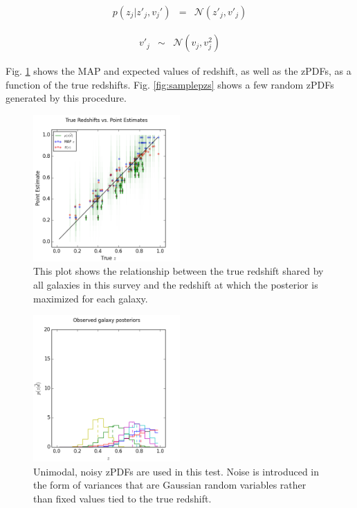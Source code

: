 \documentclass[preprint]{aastex}
\begin{document}
\begin{eqnarray}
\label{eq:zspread-noisy}
p(z_{j}|z'_{j},v_{j}') &=& \mathcal{N}(z'_{j},v'_{j})
\end{eqnarray}

\begin{eqnarray}
\label{eq:znoise}
v'_{j} &\sim& \mathcal{N}(v_{j},v^{2}_{j})
\end{eqnarray}

Fig. \ref{fig:noisycat} shows the MAP and expected values of redshift, as well 
as the zPDFs, as a function of the true redshifts.  Fig. \ref{fig:samplepzs} 
shows a few random zPDFs generated by this procedure.

\begin{figure}
\includegraphics[width=0.5\textwidth]{sigma/truevmap.png}
\caption{This plot shows the relationship between the true redshift shared by 
all galaxies in this survey and the redshift at which the posterior is 
maximized for each galaxy.}
\label{fig:noisycat}
\end{figure}

\begin{figure}
\includegraphics[width=0.5\textwidth]{sigma/samplepzs.png}
\caption{Unimodal, noisy zPDFs are used in this test.  Noise is introduced in 
the form of variances that are Gaussian random variables rather than fixed 
values tied to the true redshift.}
\label{fig:noisypzs}
\end{figure}
\end{document}
